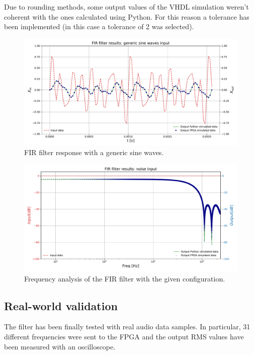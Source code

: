 \documentclass[11pt, a4paper]{article}
\begin{document}
Due to rounding methods, some output values of the VHDL simulation weren't coherent with the ones calculated using Python. For this reason a tolerance has been implemented (in this case a tolerance of 2 was selected).

\begin{figure}[!h]
    \centering
    \includegraphics[width=1.0\textwidth]{images/FIR_out.pdf}
    \caption{FIR filter response with a generic sine waves.}
    \label{fig:FIR_response}
\end{figure}

\begin{figure}[!h]
    \centering
    \includegraphics[width=1.0\textwidth]{images/fft_plot_log.pdf}
    \caption{Frequency analysis of the FIR filter with the given configuration.}
    \label{fig:FIR_freq_analysis}
\end{figure}

\subsection{Real-world validation}

The filter has been finally tested with real audio data samples. In particular, 31 different frequencies were sent to the FPGA and the output RMS values have been measured with an oscilloscope.  
\end{document}
